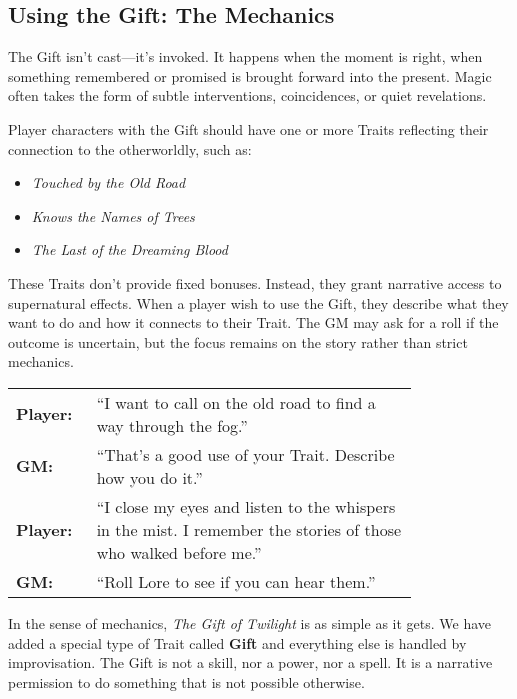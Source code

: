 \subsection{Using the Gift: The Mechanics}

The Gift isn’t cast—it’s invoked. It happens when the moment is right, when something remembered or promised is brought forward into the present. Magic often takes the form of subtle interventions, coincidences, or quiet revelations.

Player characters with the Gift should have one or more Traits reflecting their connection to the otherworldly, such as:  
\begin{WyrdExample}
    \begin{itemize}
        \item \textit{Touched by the Old Road}  
        \item \textit{Knows the Names of Trees}  
        \item \textit{The Last of the Dreaming Blood}  
    \end{itemize}
\end{WyrdExample}

These Traits don’t provide fixed bonuses. Instead, they grant narrative access to supernatural effects. When a player wish to use the Gift, they describe what they want to do and how it connects to their Trait. The GM may ask for a roll if the outcome is uncertain, but the focus remains on the story rather than strict mechanics.

\begin{WyrdExample}
    \begin{tabular}{@{}l p{0.8\linewidth}@{}}
        \textbf{Player:} & “I want to call on the old road to find a way through the fog.”  \\
        \textbf{GM:} & “That’s a good use of your Trait. Describe how you do it.” \\
        \textbf{Player:} & “I close my eyes and listen to the whispers in the mist. I remember the stories of those who walked before me.”  \\
        \textbf{GM:} & “Roll Lore to see if you can hear them.”
    \end{tabular}    
\end{WyrdExample}

In the sense of mechanics, \emph{The Gift of Twilight} is as simple as it gets. We have added a special type of Trait called \textbf{Gift} and everything else is handled by improvisation. The Gift is not a skill, nor a power, nor a spell. It is a narrative permission to do something that is not possible otherwise.

